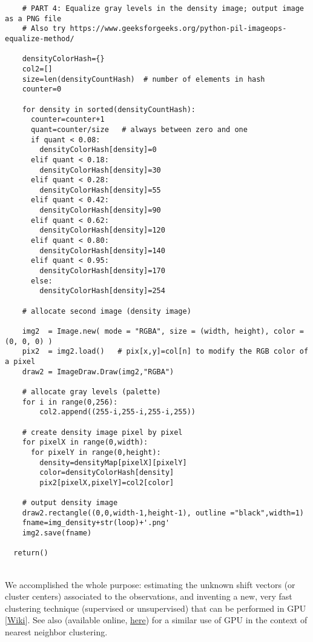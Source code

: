 \documentclass[10pt]{article}
\begin{document}
\begin{lstlisting}
    # PART 4: Equalize gray levels in the density image; output image as a PNG file 
    # Also try https://www.geeksforgeeks.org/python-pil-imageops-equalize-method/

    densityColorHash={} 
    col2=[]
    size=len(densityCountHash)  # number of elements in hash
    counter=0

    for density in sorted(densityCountHash):
      counter=counter+1
      quant=counter/size   # always between zero and one
      if quant < 0.08: 
        densityColorHash[density]=0
      elif quant < 0.18:
        densityColorHash[density]=30 
      elif quant < 0.28:
        densityColorHash[density]=55
      elif quant < 0.42:
        densityColorHash[density]=90
      elif quant < 0.62:
        densityColorHash[density]=120
      elif quant < 0.80:
        densityColorHash[density]=140
      elif quant < 0.95:
        densityColorHash[density]=170
      else:
        densityColorHash[density]=254

    # allocate second image (density image)

    img2  = Image.new( mode = "RGBA", size = (width, height), color = (0, 0, 0) )
    pix2  = img2.load()   # pix[x,y]=col[n] to modify the RGB color of a pixel
    draw2 = ImageDraw.Draw(img2,"RGBA")

    # allocate gray levels (palette)
    for i in range(0,256):
        col2.append((255-i,255-i,255-i,255))

    # create density image pixel by pixel
    for pixelX in range(0,width): 
      for pixelY in range(0,height):   
        density=densityMap[pixelX][pixelY] 
        color=densityColorHash[density]
        pix2[pixelX,pixelY]=col2[color]  

    # output density image
    draw2.rectangle((0,0,width-1,height-1), outline ="black",width=1)
    fname=img_density+str(loop)+'.png'
    img2.save(fname)

  return()
\end{lstlisting}
\quad \\
 We accomplished the whole purpose: estimating the unknown shift vectors (or cluster centers) associated to the observations, and inventing a new, very fast clustering technique (supervised or unsupervised) that
can be performed in GPU [\href{https://en.wikipedia.org/wiki/General-purpose_computing_on_graphics_processing_units}{Wiki}]. See also \cite{vgar} (available online, \href{https://arxiv.org/abs/0804.1448}{here}) for a similar use of GPU in the context of nearest neighbor clustering.
\end{document}
